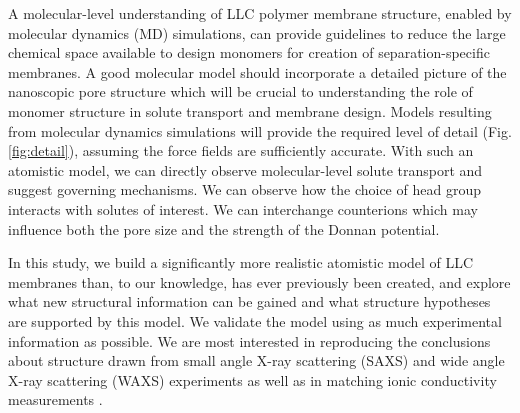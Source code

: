 \documentclass[journal=jpcbfk,manusciprt=article]{achemso}
\begin{document}
  A molecular-level understanding of LLC polymer membrane structure, enabled by
  molecular dynamics (MD) simulations, can provide guidelines to reduce the large
  chemical space available to design monomers for creation of separation-specific
  membranes. A good molecular model should incorporate a detailed picture of the
  nanoscopic pore structure which will be crucial to understanding the role of
  monomer structure in solute transport and membrane design. Models resulting
  from molecular dynamics simulations will provide the required level of detail
  (Fig. \ref{fig:detail}), assuming the force fields are sufficiently accurate.
  With such an atomistic model, we can directly observe molecular-level solute
  transport and suggest governing mechanisms. We can observe how the choice of
  head group interacts with solutes of interest. We can interchange
  counterions which may influence both the pore size and the strength of the
  Donnan potential. 

  In this study, we build a significantly more realistic atomistic model of LLC
  membranes than, to our knowledge, has ever previously been created, and explore
  what new structural information can be gained and what structure hypotheses are
  supported by this model. We validate the model using as much experimental
  information as possible. We are most interested in reproducing the conclusions
  about structure drawn from small angle X-ray scattering (SAXS)
  and wide angle X-ray scattering (WAXS) experiments as well as in matching ionic
  conductivity measurements \cite{feng_thin_2016}.
\end{document}
